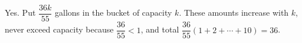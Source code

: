 Yes. Put $\dfrac{36k}{55}$ gallons in the bucket of capacity $k$. These amounts increase with $k$, never exceed capacity because $\dfrac{36}{55}<1$, and total $\dfrac{36}{55}(1+2+\cdots+10)=36$.
